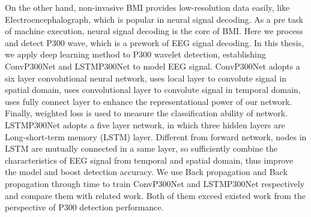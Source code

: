 \begin{englishabstract}
On the other hand, non-invasive BMI provides low-resolution data easily, like Electroencephalograph, which is popular in  neural signal decoding. As a pre task of machine execution, neural signal decoding is the core of BMI. Here we process and detect P300 wave, which is a prework of EEG signal decoding. In this thesis, we apply deep learning method to P300 wavelet detection, establishing ConvP300Net and LSTMP300Net to model EEG signal. ConvP300Net adopts a six layer convolutional neural network, uses local layer to convolute signal in spatial domain, uses convolutional layer to convolute signal in temporal domain, uses fully connect layer to enhance the representational power of our network. Finally, weighted loss is used to measure the classification ability of network. LSTMP300Net adopts a five layer network, in which three hidden layers are Long-short-term memory (LSTM) layer.  Different from forward network, nodes in LSTM are mutually connected in a same layer, so sufficiently combine the characteristics of EEG signal from temporal and spatial domain, thus improve the model and boost detection accuracy. We use Back propagation and Back propagation through time to train ConvP300Net and LSTMP300Net respectively and compare them with related work. Both of them exceed existed work from the perspective of P300 detection performance. 




\end{englishabstract}
